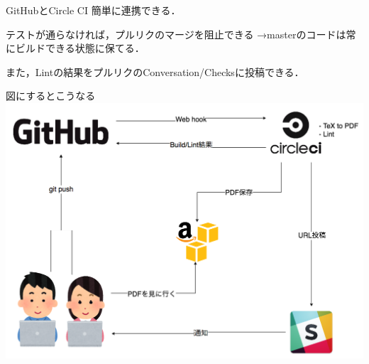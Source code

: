 \documentclass{beamer}
\begin{document}
\begin{frame}{GitHubとCircle CI}
  簡単に連携できる．

  テストが通らなければ，プルリクのマージを阻止できる
  →masterのコードは常にビルドできる状態に保てる．

  また，Lintの結果をプルリクのConversation/Checksに投稿できる．
\end{frame}

\begin{frame}{図にするとこうなる}
  \includegraphics[width=\textwidth, bb=0 0 1038 739]{img/ideal_sequence.png}
\end{frame}

\end{document}
